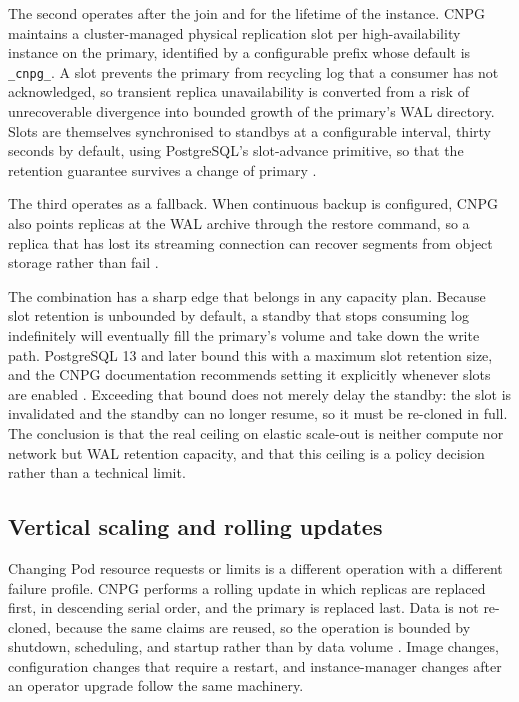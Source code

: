 \documentclass[11pt,a4paper]{article}
\begin{document}
The second operates after the join and for the lifetime of the instance. CNPG maintains a cluster-managed physical replication slot per high-availability instance on the primary, identified by a configurable prefix whose default is \texttt{\_cnpg\_}. A slot prevents the primary from recycling log that a consumer has not acknowledged, so transient replica unavailability is converted from a risk of unrecoverable divergence into bounded growth of the primary's WAL directory. Slots are themselves synchronised to standbys at a configurable interval, thirty seconds by default, using PostgreSQL's slot-advance primitive, so that the retention guarantee survives a change of primary \cite{cnpg-replication}.

The third operates as a fallback. When continuous backup is configured, CNPG also points replicas at the WAL archive through the restore command, so a replica that has lost its streaming connection can recover segments from object storage rather than fail \cite{cnpg-replication}.

The combination has a sharp edge that belongs in any capacity plan. Because slot retention is unbounded by default, a standby that stops consuming log indefinitely will eventually fill the primary's volume and take down the write path. PostgreSQL 13 and later bound this with a maximum slot retention size, and the CNPG documentation recommends setting it explicitly whenever slots are enabled \cite{cnpg-replication}. Exceeding that bound does not merely delay the standby: the slot is invalidated and the standby can no longer resume, so it must be re-cloned in full. The conclusion is that the real ceiling on elastic scale-out is neither compute nor network but WAL retention capacity, and that this ceiling is a policy decision rather than a technical limit.

\subsection{Vertical scaling and rolling updates}

Changing Pod resource requests or limits is a different operation with a different failure profile. CNPG performs a rolling update in which replicas are replaced first, in descending serial order, and the primary is replaced last. Data is not re-cloned, because the same claims are reused, so the operation is bounded by shutdown, scheduling, and startup rather than by data volume \cite{cnpg-rolling-update}. Image changes, configuration changes that require a restart, and instance-manager changes after an operator upgrade follow the same machinery.
\end{document}
